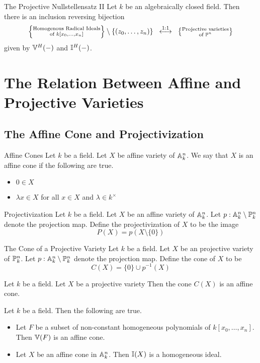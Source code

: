 \documentclass[a4paper]{article}
\begin{document}
\begin{thm}{The Projective Nullstellensatz II}{} Let $k$ be an algebraically closed field. Then there is an inclusion reversing bijection $$\left\{\substack{\text{Homogenous Radical Ideals}\\\text{of }k[x_0,\dots,x_n]}\right\}\setminus\{(z_0,\dots,z_n)\}\;\;\overset{\text{1:1}}{\longleftrightarrow}\;\;\left\{\substack{\text{Projective varieties}\\\text{of }\mathbb{P}^n}\right\}$$ given by $\mathbb{V}^H(-)$ and $\mathbb{I}^H(-)$. 
\end{thm}

\pagebreak
\section{The Relation Between Affine and Projective Varieties}
\subsection{The Affine Cone and Projectivization}
\begin{defn}{Affine Cones}{} Let $k$ be a field. Let $X$ be affine variety of $\mathbb{A}_k^n$. We say that $X$ is an affine cone if the following are true. 
\begin{itemize}
\item $0\in X$
\item $\lambda x\in X$ for all $x\in X$ and $\lambda\in k^\times$
\end{itemize}
\end{defn}

\begin{defn}{Projectivization}{} Let $k$ be a field. Let $X$ be an affine variety of $\mathbb{A}_k^n$. Let $p:\mathbb{A}_k^n\setminus\mathbb{P}_k^n$ denote the projection map. Define the projectivization of $X$ to be the image $$P(X)=p(X\setminus\{0\})$$
\end{defn}

\begin{defn}{The Cone of a Projective Variety}{} Let $k$ be a field. Let $X$ be an projective variety of $\mathbb{P}_k^n$. Let $p:\mathbb{A}_k^n\setminus\mathbb{P}_k^n$ denote the projection map. Define the cone of $X$ to be $$C(X)=\{0\}\cup p^{-1}(X)$$
\end{defn}

\begin{lmm}{}{} Let $k$ be a field. Let $X$ be a projective variety Then the cone $C(X)$ is an affine cone. 
\end{lmm}

\begin{lmm}{}{} Let $k$ be a field. Then the following are true. 
\begin{itemize}
\item Let $F$ be a subset of non-constant homogeneous polynomials of $k[x_0,\dots,x_n]$. Then $\mathbb{V}(F)$ is an affine cone. 
\item Let $X$ be an affine cone in $\mathbb{A}_k^n$. Then $\mathbb{I}(X)$ is a homogeneous ideal. 
\end{itemize}
\end{lmm}
\end{document}
